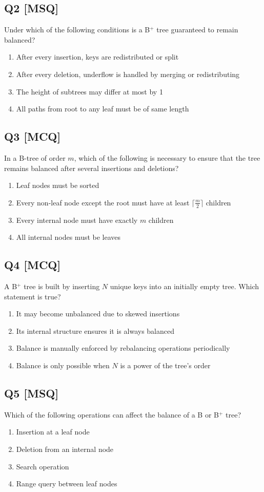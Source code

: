 \subsection*{Q2 [MSQ]}
Under which of the following conditions is a B$^+$ tree guaranteed to remain balanced?

\begin{enumerate}[label=(\alph*)]
    \item After every insertion, keys are redistributed or split
    \item After every deletion, underflow is handled by merging or redistributing
    \item The height of subtrees may differ at most by 1  
    \item All paths from root to any leaf must be of same length
\end{enumerate}

\subsection*{Q3 [MCQ]}
In a B-tree of order $m$, which of the following is necessary to ensure that the tree remains balanced after several insertions and deletions?

\begin{enumerate}[label=(\alph*)]
    \item Leaf nodes must be sorted 
    \item Every non-leaf node except the root must have at least $\lceil \frac{m}{2} \rceil$ children
    \item Every internal node must have exactly $m$ children
    \item All internal nodes must be leaves
\end{enumerate}


\subsection*{Q4 [MCQ]}
A B$^+$ tree is built by inserting $N$ unique keys into an initially empty tree. Which statement is true?

\begin{enumerate}[label=(\alph*)]
    \item It may become unbalanced due to skewed insertions
    \item Its internal structure ensures it is always balanced
    \item Balance is manually enforced by rebalancing operations periodically 
    \item Balance is only possible when $N$ is a power of the tree's order
\end{enumerate}

\subsection*{Q5 [MSQ]}
Which of the following operations can affect the balance of a B or B$^+$ tree?

\begin{enumerate}[label=(\alph*)]
    \item Insertion at a leaf node
    \item Deletion from an internal node
    \item Search operation
    \item Range query between leaf nodes
\end{enumerate}
